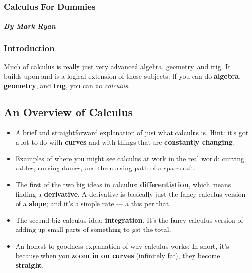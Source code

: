 \documentclass{article}
\begin{document}
\begin{center}
\section*{\LARGE Calculus For Dummies}
\subsubsection*{By Mark Ryan}
\newpage
\section*{Introduction}

\end{center}
Much of calculus is really just very
advanced algebra, geometry, and trig. It builds upon and is a logical extension of those subjects. If you can do \textbf{algebra}, \textbf{geometry}, and \textbf{trig}, you can do
\textit{calculus}.

\begin{center}
    \part{An Overview of Calculus}
    \begin{itemize}
        \item A brief and straightforward explanation of just what calculus is.
        Hint: it’s got a lot to do with \textbf{curves} and with things that are
        \textbf{constantly changing}.

        \item Examples of where you might see calculus at work in the real
        world: curving cables, curving domes, and the curving path of a
        spacecraft.
        \item The first of the two big ideas in calculus: \textbf{differentiation}, which
        means finding a \textbf{derivative}. A derivative is basically just the
        fancy calculus version of a \textbf{slope}; and it’s a simple rate — a this
        per that.
        \item The second big calculus idea: \textbf{integration}. It’s the fancy calculus
        version of adding up small parts of something to get the total.
        \item An honest-to-goodness explanation of why calculus works: In
        short, it’s because when you \textbf{zoom in on curves} (infinitely far),
        they become \textbf{straight}.
    
    \end{itemize}

  
\end{center}
\newpage
\end{document}
